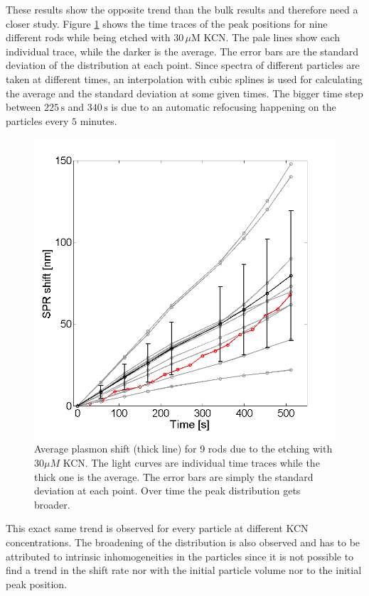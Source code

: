 \documentclass[twocolumn]{article}
\begin{document}
These results show the opposite trend than the bulk results and therefore need a
closer study. Figure \ref{fig:plasmon_average} shows the time traces of the peak
positions for nine different rods while being etched with $30\,\mu\textrm{M}$
KCN. The pale lines show each individual trace, while the darker is the average.
The error bars are the standard deviation of the distribution at each point.
Since spectra of different particles are taken at different times, an
interpolation with cubic splines is used for calculating the average and the
standard deviation at some given times. The bigger time step between
$225\,\textrm{s}$ and $340\,\textrm{s}$ is due to an automatic refocusing
happening on the particles every $5$ minutes.

\begin{figure}[hbt]
 \centering
 \includegraphics[width=0.95\linewidth]{plasmon_average.png}
 \caption{Average plasmon shift (thick line) for 9 rods due to the etching with
 $30\mu M$ KCN. The light curves are individual time traces while the thick one
 is the average. The error bars are simply the standard deviation at each point. Over
 time the peak distribution gets broader.}
 \label{fig:plasmon_average}
\end{figure}

This exact same trend is observed for every particle at different KCN
concentrations. The broadening of the distribution is also observed and has to
be attributed to intrinsic inhomogeneities in the particles since it is not
possible to find a trend in the shift rate nor with the initial particle 
volume nor to the initial peak position. 
\end{document}
